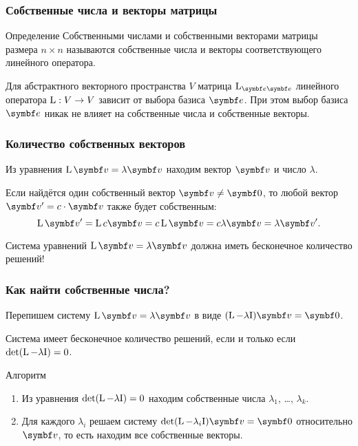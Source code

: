         



\begin{frame}
    \frametitle{Собственные числа и векторы матрицы}

    \begin{block}{Определение}
        \alert{Собственными числами} и \alert{собственными векторами} матрицы размера $n\times n$ называются собственные числа и векторы 
        соответствующего линейного оператора.
    \end{block}
    \pause

    Для абстрактного векторного пространства $V$ матрица $\LL_{\be \be}$ линейного оператора $\operatorname{L}: V\to V$ зависит от выбора базиса $\be$.
    При этом выбор базиса $\be$ никак не влияет на собственные числа и собственные векторы. 
\end{frame}


\begin{frame}
    \frametitle{Количество собственных векторов}

    Из уравнения $\LL \bv = \lambda \bv$ находим вектор $\bv$ и число $\lambda$.

    \pause

    Если найдётся один собственный вектор $\bv \neq \bzero$, то любой вектор $\bv' = c \cdot \bv$ также будет собственным:
    \pause
    \[
    \LL \bv' = \LL c \bv = c \LL \bv = c \lambda \bv = \lambda \bv'.
    \]

    \pause
    Система уравнений $\LL \bv = \lambda \bv$ должна иметь бесконечное количество решений!


\end{frame}


\begin{frame}
    \frametitle{Как найти собственные числа?}

    Перепишем систему $\LL \bv = \lambda \bv$ в виде $(\LL - \lambda \Id) \bv = \bzero$.
    
    \pause

    Система имеет бесконечное количество решений, если и только если $\det (\operatorname{L} - \lambda \mathrm{I}) = 0$.

    \pause

    \begin{block}{Алгоритм}
        \begin{enumerate}
            \item Из уравнения $\det (\operatorname{L} - \lambda \mathrm{I}) = 0$ находим собственные числа $\lambda_1$, \ldots, $\lambda_k$. \pause
            \item Для каждого $\lambda_i$ решаем систему $\det (\LL - \lambda_i \Id) \bv = \bzero$ относительно $\bv$, то есть находим все собственные векторы. 
        \end{enumerate}
    \end{block}

    
\end{frame}


